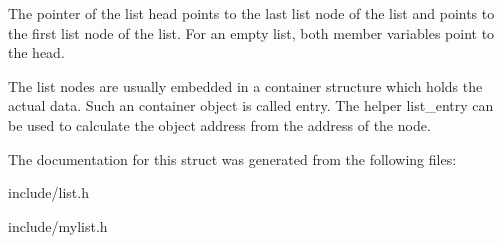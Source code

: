 The  pointer of the list head points to the last list node of the list and  points to the first list node of the list. For an empty list, both member variables point to the head.

The list nodes are usually embedded in a container structure which holds the actual data. Such an container object is called entry. The helper list\+\_\+entry can be used to calculate the object address from the address of the node. 

The documentation for this struct was generated from the following files\+:\begin{DoxyCompactItemize}
\item 
include/list.\+h\item 
include/mylist.\+h\end{DoxyCompactItemize}
